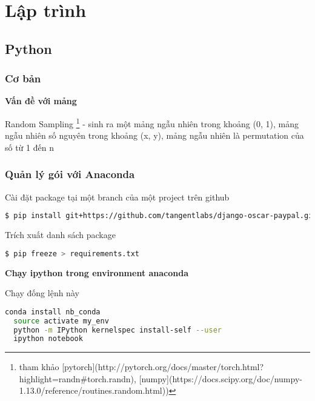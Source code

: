 \part{Lập trình}

\chapter{Python}


\section{Cơ bản}

\textbf{Vấn đề với mảng}

\begin{item}
  \item Random Sampling \footnote{tham khảo [pytorch](http://pytorch.org/docs/master/torch.html?highlight=randn#torch.randn), [numpy](https://docs.scipy.org/doc/numpy-1.13.0/reference/routines.random.html))} - sinh ra một mảng ngẫu nhiên trong khoảng (0, 1), mảng ngẫu nhiên số nguyên trong khoảng (x, y), mảng ngẫu nhiên là permutation của số từ 1 đến n
\end{item}

\section{Quản lý gói với Anaconda}

\noindent Cài đặt package tại một branch của một project trên github

\begin{lstlisting}[language=bash]
  $ pip install git+https://github.com/tangentlabs/django-oscar-paypal.git@issue/34/oscar-0.6#egg=django-oscar-paypal
\end{lstlisting}

\noindent Trích xuất danh sách package

\begin{lstlisting}[language=bash]
 $ pip freeze > requirements.txt
\end{lstlisting}

\noindent \textbf{Chạy ipython trong environment anaconda}

\noindent Chạy đống lệnh này

\begin{lstlisting}[language=bash]
  conda install nb_conda
  source activate my_env
  python -m IPython kernelspec install-self --user
  ipython notebook
\end{lstlisting}

